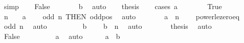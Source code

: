\begin{isabellebody}
\ simp\isanewline
{}\isamarkupfalse%
\isanewline
\ \ \isamarkupfalse%
\ False\isanewline
\ \ \isamarkupfalse%
\ \isamarkupfalse%
\ {\isachardoublequoteopen}{}\ {\isasymle}\ b{\isachardoublequoteclose}\ \isamarkupfalse%
\ auto\isanewline
\ \ \isamarkupfalse%
\ {\isacharquery}{\kern0pt}thesis\isanewline
\ \ \isamarkupfalse%
\ {\isacharparenleft}{\kern0pt}cases\ {\isachardoublequoteopen}a\ {\isacharless}{\kern0pt}\ {}{\isachardoublequoteclose}{\isacharparenright}{\kern0pt}\isanewline
\ \ \ \ \isamarkupfalse%
\ True\isanewline
\ \ \ \ \isamarkupfalse%
\ \isamarkupfalse%
\ {\isachardoublequoteopen}n\ {\isasymnoteq}\ {}{\isachardoublequoteclose}\ \ {\isachardoublequoteopen}a\ {\isasymle}\ {}{\isachardoublequoteclose}\ \isamarkupfalse%
\ {\isacartoucheopen}odd\ n{\isacartoucheclose}\ {\isacharbrackleft}{\kern0pt}THEN\ odd{\isacharunderscore}{\kern0pt}pos{\isacharbrackright}{\kern0pt}\ \isamarkupfalse%
\ auto\isanewline
\ \ \ \ \isamarkupfalse%
\ \isamarkupfalse%
\ {\isachardoublequoteopen}a\ {\isacharcircum}{\kern0pt}\ n\ {\isasymle}\ {}{\isachardoublequoteclose}\ \isamarkupfalse%
\ power{\isacharunderscore}{\kern0pt}le{\isacharunderscore}{\kern0pt}zero{\isacharunderscore}{\kern0pt}eq\ \isamarkupfalse%
\ {\isacartoucheopen}odd\ n{\isacartoucheclose}\ \isamarkupfalse%
\ auto\isanewline
\ \ \ \ \isamarkupfalse%
\ \isamarkupfalse%
\ {\isacartoucheopen}{}\ {\isasymle}\ b{\isacartoucheclose}\ \isamarkupfalse%
\ {\isachardoublequoteopen}{}\ {\isasymle}\ b\ {\isacharcircum}{\kern0pt}\ n{\isachardoublequoteclose}\ \isamarkupfalse%
\ auto\isanewline
\ \ \ \ \isamarkupfalse%
\ \isamarkupfalse%
\ {\isacharquery}{\kern0pt}thesis\ \isamarkupfalse%
\ auto\isanewline
\ \ \isamarkupfalse%
\isanewline
\ \ \ \ \isamarkupfalse%
\ False\isanewline
\ \ \ \ \isamarkupfalse%
\ \isamarkupfalse%
\ {\isachardoublequoteopen}{}\ {\isasymle}\ a{\isachardoublequoteclose}\ \isamarkupfalse%
\ auto\isanewline
\ \ \ \ \isamarkupfalse%
\ {\isacartoucheopen}a\ {\isasymle}\ b{\isacartoucheclose}\ \isamarkupfalse%

\end{isabellebody}
